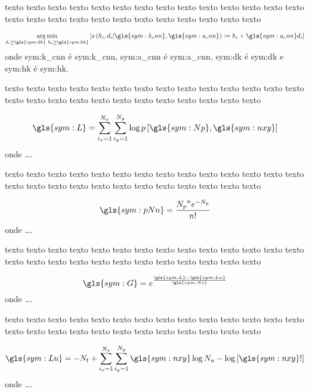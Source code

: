 texto texto texto texto texto texto texto texto texto texto texto texto texto
texto texto texto texto texto texto texto texto texto texto texto texto texto

\begin{equation}
	\ensuremath{
		\underset{d_i \ge \gls{sym:dk} \\\ h_i \ge \gls{sym:hk}}{\argmin} 
		\left[ s\left(h_i,d_i\arrowvert\gls{sym:k_cnn},\gls{sym:a_cnn}\right) 
		:= h_i + \gls{sym:a_cnn}d_i \right]  
	}
	\label{eq:helms_cnn}
\end{equation}
onde \gls{sym:k_cnn} é \glsdesc{sym:k_cnn},
	 \gls{sym:a_cnn} é \glsdesc{sym:a_cnn},
	 \gls{sym:dk} é \glsdesc{sym:dk} e 
	 \gls{sym:hk} é \glsdesc{sym:hk}.


texto texto texto texto texto texto texto texto texto texto texto texto texto
texto texto texto texto texto texto texto texto texto texto texto texto texto


\begin{equation}
	\ensuremath{
		\gls{sym:L} = \sum_{i_x=1}^{N_x}\sum_{i_y=1}^{N_y}\log p\left[  \gls{sym:Np}, \gls{sym:nxy}  \right]
	}
	\label{eq:loglik}
\end{equation}
onde \ldots.


texto texto texto texto texto texto texto texto texto texto texto texto texto
texto texto texto texto texto texto texto texto texto texto texto texto texto


\begin{equation}
	\ensuremath{
		\gls{sym:pNn} = \frac{{N_p}^n e^{-N_p}}
							 {n!}
	}
	\label{eq:loglik}
\end{equation}
onde \ldots.


texto texto texto texto texto texto texto texto texto texto texto texto texto
texto texto texto texto texto texto texto texto texto texto texto texto texto


\begin{equation}
	\ensuremath{
		\gls{sym:G} = e^{ \frac{\gls{sym:L} - \gls{sym:Lu}}{\gls{sym:Nt}}   }
	}
	\label{eq:gain}
\end{equation}
onde \ldots.


texto texto texto texto texto texto texto texto texto texto texto texto texto
texto texto texto texto texto texto texto texto texto texto texto texto texto


\begin{equation}
	\ensuremath{
		\gls{sym:Lu} = -N_t + 
		\sum_{i_x = 1}^{N_x}\sum_{i_y=1}^{N_y}
		\gls{sym:nxy}\log N_u - \log \left[ \gls{sym:nxy}! \right]
	}
	\label{eq:lu}
\end{equation}
onde \ldots.


